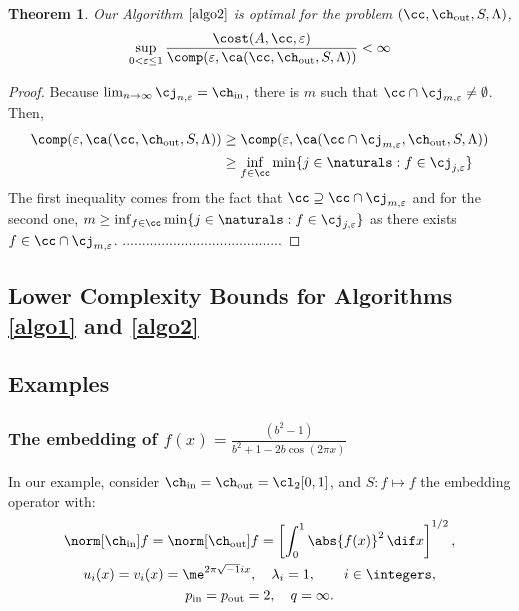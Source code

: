 \documentclass[final]{elsarticle}
\newcommand{\chin}{\ch_{\text{\rm{in}}}}
\newcommand{\chout}{\ch_{\text{\rm{out}}}}
\newcommand{\pin}{p_{\text{\rm{in}}}}
\newcommand{\pout}{p_{\text{\rm{out}}}}
\newtheorem{theorem}{Theorem}
\theoremstyle{definition}
\theoremstyle{remark}
\begin{document}
\begin{theorem}\label{optimality}
Our Algorithm $\ref{algo2}$ is optimal for the problem $(\cc,\chout,S,\Lambda)$,
\begin{equation*}
\sup_{0 < \varepsilon \le 1}\frac{\cost(A,\cc,\varepsilon)} {\comp(\varepsilon,\ca(\cc,\chout,S,\Lambda))} <\infty
\end{equation*}
\end{theorem}
\begin{proof}
Because $\lim_{n\rightarrow\infty}\cj_{n,\varepsilon}=\chin$, there is $m$ such that $\cc\cap\cj_{m,\varepsilon}\neq\emptyset$. Then,
\begin{align*}
\comp(\varepsilon,\ca(\cc,\chout,S,\Lambda))&\ge\comp(\varepsilon,\ca(\cc\cap\cj_{m,\varepsilon},\chout,S,\Lambda))\\
&\ge\inf_{f\in\cc}\min\{j\in\naturals:f\in\cj_{j,\varepsilon}\}
\end{align*}
The first inequality comes from the fact that $\cc\supseteq\cc\cap\cj_{m,\varepsilon}$ and for the second one, $m\ge\inf_{f\in\cc}\min\{j\in\naturals:f\in\cj_{j,\varepsilon}\}$ as there exists $f\in\cc\cap\cj_{m,\varepsilon}$.
.........................................
\end{proof}

\subsection{Lower Complexity Bounds for Algorithms \ref{algo1} and \ref{algo2}}



\subsection{Examples}
\subsubsection{The embedding of $f(x)=\frac{(b^2-1)}{b^2+1-2b\cos(2\pi x)}$}

In our example, consider $\chin=\chout=\cl_2[0,1]$, and $S: f \mapsto f$ the embedding operator with:
\begin{gather*}
\norm[\chin]{f} = \norm[\chout]{f} = \left[\int_0^1 \abs{f(x)}^2 \, \dif x \right]^{1/2}, \\
u_{i}(x) = v_i(x) = \me^{2 \pi \sqrt{-1} i x},\quad \lambda_i=1, \qquad i \in \integers,\\
\pin=\pout=2,\quad q=\infty.
\end{gather*}
\end{document}
